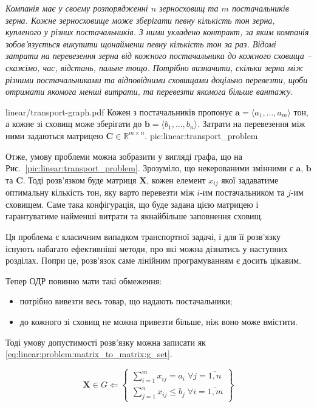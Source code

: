 \documentclass[\main/book.tex]{subfiles}
\begin{document}
\textit{Компанія має у своєму розпорядженні $n$ зерносховищ та $m$ постачальників зерна. Кожне зерносховище може зберігати певну кількість тон зерна, купленого у різних постачальників. З ними укладено контракт, за яким компанія зобов'язується викупити щонайменш певну кількість тон за раз. Відомі затрати на перевезення зерна від кожного постачальника до кожного сховища -- скажімо, час, відстань, пальне тощо. Потрібно визначити, скільки зерна між різними постачальниками та відповідними сховищами доцільно перевезти, щоби отримати якомога менші витрати, та перевезти якомога більше вантажу.}

\illustration
 {linear/transport-graph.pdf}
 {Кожен з постачальників пропонує $\mathbf{a} = {\langle a_1, \ldots, a_m \rangle}$ тон, а кожне зі сховищ може зберігати до $\mathbf{b} = {\langle b_1, \ldots, b_n \rangle}$. Затрати на перевезення між ними задаються матрицею $\mathbf{C} \in \mathbb{R}^{m \times n}$.}
 {pic:linear:transport_problem}

Отже, умову проблеми можна зобразити у вигляді графа, що на Рис.~\ref{pic:linear:transport_problem}. Зрозуміло, що некерованими змінними є $\mathbf{a}$, $\mathbf{b}$ та $\mathbf{C}$. Тоді розв'язком буде матриця $\mathbf{X}$, кожен елемент $x_{ij}$ якої задаватиме \flqq{}оптимальну\frqq{} кількість тон, яку варто перевезти між $i$-им постачальником та $j$-им сховищем. Саме така конфігурація, що буде задана цією матрицею і гарантуватиме найменші витрати та якнайбільше заповнення сховищ.

\begin{note}
 Ця проблема є класичним випадком транспортної задачі, і для її розв'язку існують набагато ефективніші методи, про які можна дізнатись у наступних розділах. Попри це, розв'язок саме лінійним програмуванням є досить цікавим.
\end{note}

Тепер ОДР повинно мати такі обмеження:

\begin{itemize}
 \item потрібно вивезти весь товар, що надають постачальники;
 \item до кожного зі сховищ не можна привезти більше, ніж воно може вмістити.
\end{itemize}

Тоді умову допустимості розв'язку можна записати як \ref{eq:linear:problem:matrix_to_matrix:g_set}.

\begin{equation}
 \mathbf{X} \in G \Leftarrow \left\{
 \begin{array}{l}
  \displaystyle
  \sum_{i=1}^m x_{ij} = a_i\; \forall j = \overline{1, n} \\
  \displaystyle
  \sum_{j=1}^n x_{ij} \leq b_j\; \forall i = \overline{1, m}
 \end{array}
 \right\}
 \label{eq:linear:problem:matrix_to_matrix:g_set}
\end{equation}
\end{document}
